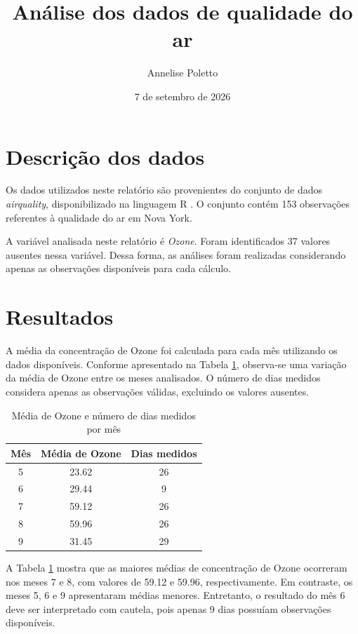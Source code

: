 \documentclass[12pt,a4paper]{article}
\title{Análise dos dados de qualidade do ar}
\author{Annelise Poletto}
\date{7 de setembro de 2026}
\begin{document}
\maketitle

\section{Descrição dos dados}

Os dados utilizados neste relatório são provenientes do conjunto de dados
\textit{airquality}, disponibilizado na linguagem R \cite{RCore}. O conjunto
contém 153 observações referentes à qualidade do ar em Nova York.

A variável analisada neste relatório é \textit{Ozone}. Foram identificados
37 valores ausentes nessa variável. Dessa forma, as análises foram realizadas
considerando apenas as observações disponíveis para cada cálculo.

\section{Resultados}

A média da concentração de Ozone foi calculada para cada mês utilizando os
dados disponíveis. Conforme apresentado na Tabela \ref{tab:medias}, observa-se
uma variação da média de Ozone entre os meses analisados. O número de dias
medidos considera apenas as observações válidas, excluindo os valores ausentes.

\begin{table}[htbp]
\centering
\caption{Média de Ozone e número de dias medidos por mês}
\label{tab:medias}

\begin{tabular}{ccc}
\toprule
Mês & Média de Ozone & Dias medidos \\
\midrule
5 & 23.62 & 26 \\
6 & 29.44 & 9 \\
7 & 59.12 & 26 \\
8 & 59.96 & 26 \\
9 & 31.45 & 29 \\
\bottomrule
\end{tabular}

\end{table}

A Tabela \ref{tab:medias} mostra que as maiores médias de concentração de
Ozone ocorreram nos meses 7 e 8, com valores de 59.12 e 59.96,
respectivamente. Em contraste, os meses 5, 6 e 9 apresentaram médias menores.
Entretanto, o resultado do mês 6 deve ser interpretado com cautela, pois apenas
9 dias possuíam observações disponíveis.
\end{document}
